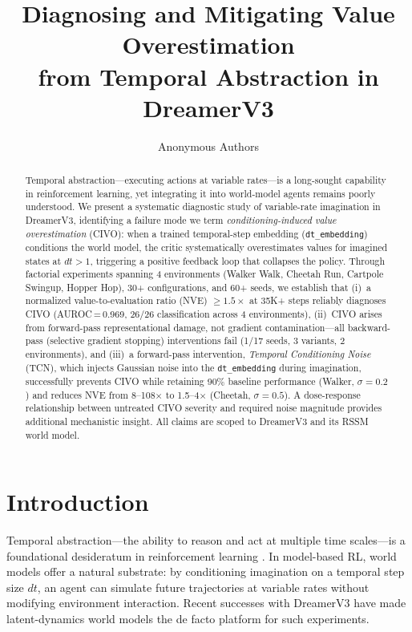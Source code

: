 \documentclass[10pt,letterpaper]{article}
\title{Diagnosing and Mitigating Value Overestimation\\from Temporal Abstraction in DreamerV3}
\author{Anonymous Authors}
\date{}
\begin{document}
\maketitle

\begin{abstract}
Temporal abstraction---executing actions at variable rates---is a long-sought capability in reinforcement learning, yet integrating it into world-model agents remains poorly understood.
We present a systematic diagnostic study of variable-rate imagination in DreamerV3, identifying a failure mode we term \emph{conditioning-induced value overestimation} (CIVO): when a trained temporal-step embedding (\texttt{dt\_embedding}) conditions the world model, the critic systematically overestimates values for imagined states at $dt>1$, triggering a positive feedback loop that collapses the policy.
Through factorial experiments spanning 4 environments (Walker Walk, Cheetah Run, Cartpole Swingup, Hopper Hop), 30+ configurations, and 60+ seeds, we establish that
(i)~a normalized value-to-evaluation ratio (NVE) $\geq 1.5\times$ at 35K+ steps reliably diagnoses CIVO (AUROC\,=\,0.969, 26/26 classification across 4 environments),
(ii)~CIVO arises from forward-pass representational damage, not gradient contamination---all backward-pass (selective gradient stopping) interventions fail (1/17 seeds, 3 variants, 2 environments),
and (iii)~a forward-pass intervention, \emph{Temporal Conditioning Noise} (TCN), which injects Gaussian noise into the \texttt{dt\_embedding} during imagination, successfully prevents CIVO while retaining 90\% baseline performance (Walker, $\sigma=0.2$) and reduces NVE from 8--108$\times$ to 1.5--4$\times$ (Cheetah, $\sigma=0.5$).
A dose-response relationship between untreated CIVO severity and required noise magnitude provides additional mechanistic insight.
All claims are scoped to DreamerV3 and its RSSM world model.
\end{abstract}

\section{Introduction}

Temporal abstraction---the ability to reason and act at multiple time scales---is a foundational desideratum in reinforcement learning \cite{sutton1999between,precup2000temporal}.
In model-based RL, world models offer a natural substrate: by conditioning imagination on a temporal step size $dt$, an agent can simulate future trajectories at variable rates without modifying environment interaction.
Recent successes with DreamerV3 \cite{hafner2023mastering} have made latent-dynamics world models the de facto platform for such experiments.
\end{document}

